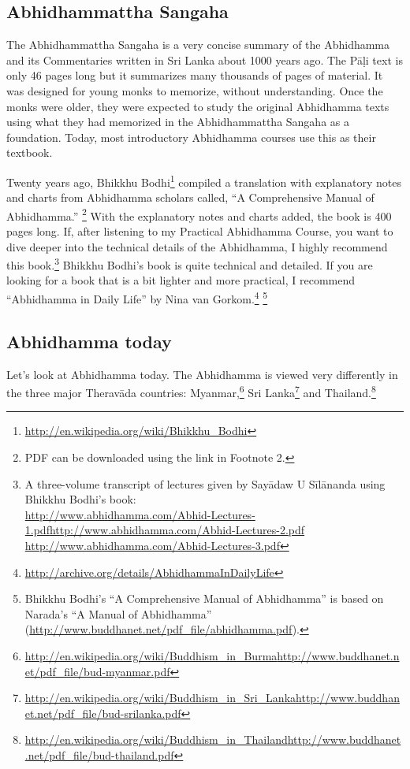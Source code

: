 \subsection*{Abhidhammattha Sangaha}

The Abhidhammattha Sangaha is a very concise summary of the Abhidhamma and its Commentaries written in Sri Lanka about 1000 years ago. The Pāḷi text is only 46 pages long but it summarizes many thousands of pages of material. It was designed for young monks to memorize, without understanding. Once the monks were older, they were expected to study the original Abhidhamma texts using what they had memorized in the Abhidhammattha Sangaha as a foundation. Today, most introductory Abhidhamma courses use this as their textbook.

Twenty years ago, Bhikkhu Bodhi\footnote{\url{http://en.wikipedia.org/wiki/Bhikkhu_Bodhi}} compiled a translation with explanatory notes and charts from Abhidhamma scholars called, “A Comprehensive Manual of Abhidhamma.” \footnote{PDF can be downloaded using the link in Footnote 2.} With the explanatory notes and charts added, the book is 400 pages long. If, after listening to my Practical Abhidhamma Course, you want to dive deeper into the technical details of the Abhidhamma, I highly recommend this book.\footnote{A three-volume transcript of lectures given by Sayādaw U Sīlānanda using Bhikkhu Bodhi’s book:\\ \url{http://www.abhidhamma.com/Abhid-Lectures-1.pdf}\linebreak \url{http://www.abhidhamma.com/Abhid-Lectures-2.pdf} \linebreak \url{http://www.abhidhamma.com/Abhid-Lectures-3.pdf}} Bhikkhu Bodhi’s book is quite technical and detailed. If you are looking for a book that is a bit lighter and more practical, I recommend “Abhidhamma in Daily Life” by Nina van Gorkom.\footnote{\url{http://archive.org/details/AbhidhammaInDailyLife}} \footnote{Bhikkhu Bodhi's “A Comprehensive Manual of Abhidhamma” is based on Narada's “A Manual of Abhidhamma” (\url{http://www.buddhanet.net/pdf_file/abhidhamma.pdf}).}

\subsection*{Abhidhamma today}

Let’s look at Abhidhamma today. The Abhidhamma is viewed very differently in the three major Theravāda countries: Myanmar,\footnote{\url{http://en.wikipedia.org/wiki/Buddhism_in_Burma}\linebreak\url{http://www.buddhanet.net/pdf_file/bud-myanmar.pdf}} Sri Lanka\footnote{\url{http://en.wikipedia.org/wiki/Buddhism_in_Sri_Lanka}\linebreak\url{http://www.buddhanet.net/pdf_file/bud-srilanka.pdf}} and Thailand.\footnote{\url{http://en.wikipedia.org/wiki/Buddhism_in_Thailand}\linebreak\url{http://www.buddhanet.net/pdf_file/bud-thailand.pdf}}

